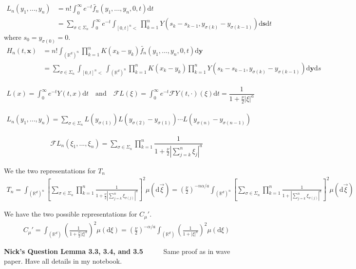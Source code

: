 \documentclass[a4paper,11pt]{article}
\numberwithin{equation}{section}
\theoremstyle{plain}
\theoremstyle{definition}
\newcommand{\ud}{\ensuremath{\mathrm{d} }}
\newcommand{\R}{\mathbb{R}}
\newcounter{NQ}
\newenvironment{NickQuestion}[1][] %
{\refstepcounter{NQ}
	\begin{mdframed}[backgroundcolor=lightgray]\textbf{Nick's Question \theNQ \: #1~~}~~~\noindent}%
	{\end{mdframed}}
\numberwithin{NQ}{section}
\numberwithin{LQ}{section}
\numberwithin{ZQ}{section}
\begin{document}
	\begin{align*}
	L_n(y_1,...,y_n) &= n! \int_0^\infty e^{-t}\tilde{f_n}(y_1,...,y_n,0,t) \ud t
	\\&= \sum_{\sigma \in \Sigma_n} \int_0^\infty e^{-t} \int_{[0,t]^n<} \prod_{k=1}^n Y(s_k - s_{k-1}, y_{\sigma(k)}-y_{\sigma(k-1)}) \ud \textbf{s} \ud t
	\end{align*}
	where $s_0 = y_{\sigma(0)} = 0$.
	\begin{align*}
	H_n(t, \textbf{x}) &= n! \int_{(\R^d)^n} \prod_{k=1}^n K(x_k - y_k) \tilde{f_n}(y_1,...,y_n,0,t) \ud \textbf{y}
	\\&= \sum_{\sigma \in \Sigma_n} \int_{[0,t]^n <} \int_{(\R^d)^n} \prod_{k=1}^n K(x_k-y_k) \prod_{k=1}^n Y(s_k - s_{k-1}, y_{\sigma(k)} - y_{\sigma(k-1)}) \ud \textbf{y} \ud s
	\end{align*}

	\begin{align*}
	L(x) = \int_0^\infty e^{-t}Y(t,x) \ud t \quad \text{and} \quad \mathcal{F}L(\xi) = \int_0^\infty e^{-t}\mathcal{F}Y(t,\cdot)(\xi) \ud t = \dfrac{1}{1 + \frac{\nu}{2}|\xi|^a}
	\end{align*}

	\begin{align*}
	L_n(y_1,...,y_n) = \sum_{\sigma \in \Sigma_n} L(y_{\sigma(1)}) L(y_{\sigma(2)}-y_{\sigma(1)}) \cdots L(y_{\sigma(n)}-y_{\sigma(n-1)})
	\end{align*}

	\begin{align*}
	\mathcal{F}L_n(\xi_1,...,\xi_n) = \sum_{\sigma \in \Sigma_n} \prod_{k=1}^{n} \dfrac{1}{1+ \frac{\nu}{2}\left|\sum_{j=k}^n \xi_j \right|^a}
	\end{align*}

	We the two representations for $T_n$
	\begin{align*}
	T_n = \int_{(\R^d)^n} \left[\sum_{\sigma \in \Sigma_n} \prod_{k=1}^n \frac{1}{1+\frac{\nu}{2}\left|\sum_{j=k}^n \xi_{\sigma(j)} \right|^a}\right]^2 \mu(\ud \vec{\xi})  = \left( \frac{\nu}{2} \right)^{-n\alpha/a}  \int_{(\R^d)^n} \left[\sum_{\sigma \in \Sigma_n} \prod_{k=1}^n \frac{1}{1+\left|\sum_{j=k}^n \xi_{\sigma(j)} \right|^a}\right]^2 \mu(\ud \vec{\xi} )
	\end{align*}

	We have the two possible representations for $C_\mu'$.
	\begin{align*}
	C_\mu ' = \int_{(\R^d)} \left(\frac{1}{1+\frac{\nu}{2}|\xi|^a}\right)^2 \mu(\ud \xi) = \left( \frac{\nu}{2} \right)^{-\alpha/a}\int_{(\R^d)} \left(\frac{1}{1+|\xi|^a}\right)^2 \mu(\ud \xi)
	\end{align*}
	\begin{NickQuestion}[Lemma 3.3, 3.4, and 3.5]
		Same proof as in wave paper. Have all details in my notebook.
	\end{NickQuestion}
\end{document}
